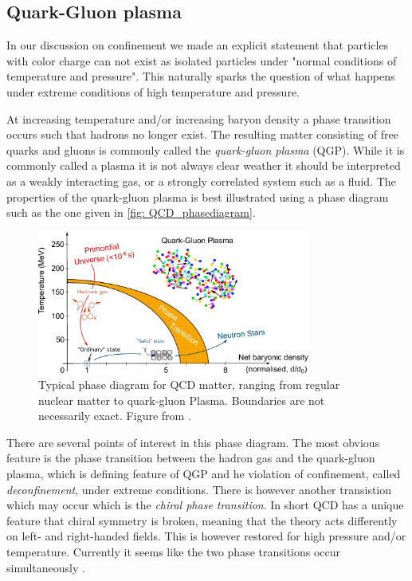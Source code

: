 \documentclass[main.tex]{subfiles}
\begin{document}
\subsection{Quark-Gluon plasma}
In our discussion on confinement we made an explicit statement that particles with color charge can not exist as isolated particles under "normal conditions of temperature and pressure". This naturally sparks the question of what happens under extreme conditions of high temperature and pressure.

At increasing temperature and/or increasing baryon density a phase transition occurs such that hadrons no longer exist. The resulting matter consisting of free quarks and gluons is commonly called the \emph{quark-gluon plasma} (QGP). While it is commonly called a plasma it is not always clear weather it should be interpreted as a weakly interacting gas, or a strongly correlated system such as a fluid. 
The properties of the quark-gluon plasma is best illustrated using a phase diagram such as the one given in \autoref{fig: QCD_phasediagram}. 
\begin{figure}[htb]
    \centering
    \includegraphics[width=9cm]{pictures/figures/QGP_phasediagram.png}
    \caption{Typical phase diagram for QCD matter, ranging from regular nuclear matter to quark-gluon Plasma. Boundaries are not necessarily exact. Figure from \cite{QCD_phasediagram_MaireAntonin}.}
    \label{fig: QCD_phasediagram}
\end{figure}

There are several points of interest in this phase diagram. The most obvious feature is the phase transition between the hadron gas and the quark-gluon plasma, which is defining feature of QGP and he violation of confinement, called \emph{deconfinement}, under extreme conditions. There is however another transistion which may occur which is the \emph{chiral phase transition}. In short QCD has a unique feature that chiral symmetry is broken, meaning that the theory acts differently on left- and right-handed fields. This is however restored for high pressure and/or temperature. Currently it seems like the two phase transitions occur simultaneously \cite{florkowski2010phenomenology}.
\end{document}
